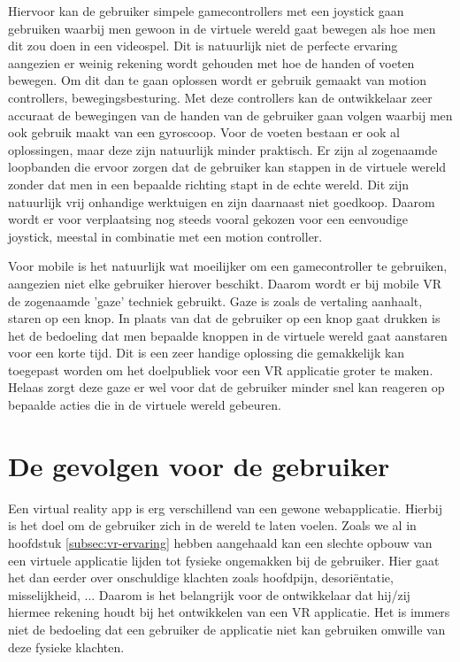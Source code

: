 Hiervoor kan de gebruiker simpele gamecontrollers met een joystick gaan gebruiken waarbij men gewoon in de virtuele wereld gaat bewegen als hoe men dit zou doen in een videospel. Dit is natuurlijk niet de perfecte ervaring aangezien er weinig rekening wordt gehouden met hoe de handen of voeten bewegen. Om dit dan te gaan oplossen wordt er gebruik gemaakt van motion controllers, bewegingsbesturing. Met deze controllers kan de ontwikkelaar zeer accuraat de bewegingen van de handen van de gebruiker gaan volgen waarbij men ook gebruik maakt van een gyroscoop. Voor de voeten bestaan er ook al oplossingen, maar deze zijn natuurlijk minder praktisch. Er zijn al zogenaamde loopbanden die ervoor zorgen dat de gebruiker kan stappen in de virtuele wereld zonder dat men in een bepaalde richting stapt in de echte wereld. Dit zijn natuurlijk vrij onhandige werktuigen en zijn daarnaast niet goedkoop. Daarom wordt er voor verplaatsing nog steeds vooral gekozen voor een eenvoudige joystick, meestal in combinatie met een motion controller.

Voor mobile is het natuurlijk wat moeilijker om een gamecontroller te gebruiken, aangezien niet elke gebruiker hierover beschikt. Daarom wordt er bij mobile VR de zogenaamde 'gaze' techniek gebruikt. Gaze is zoals de vertaling aanhaalt, staren op een knop. In plaats van dat de gebruiker op een knop gaat drukken is het de bedoeling dat men bepaalde knoppen in de virtuele wereld gaat aanstaren voor een korte tijd. Dit is een zeer handige oplossing die gemakkelijk kan toegepast worden om het doelpubliek voor een VR applicatie groter te maken. Helaas zorgt deze gaze er wel voor dat de gebruiker minder snel kan reageren op bepaalde acties die in de virtuele wereld gebeuren.

\section{De gevolgen voor de gebruiker}
\label{sec:gevolgen-vr}
Een virtual reality app is erg verschillend van een gewone webapplicatie. Hierbij is het doel om de gebruiker zich in de wereld te laten voelen. Zoals we al in hoofdstuk \ref{subsec:vr-ervaring} hebben aangehaald kan een slechte opbouw van een virtuele applicatie lijden tot fysieke ongemakken bij de gebruiker. Hier gaat het dan eerder over onschuldige klachten zoals hoofdpijn, desoriëntatie, misselijkheid, ... Daarom is het belangrijk voor de ontwikkelaar dat hij/zij hiermee rekening houdt bij het ontwikkelen van een VR applicatie. Het is immers niet de bedoeling dat een gebruiker de applicatie niet kan gebruiken omwille van deze fysieke klachten.


